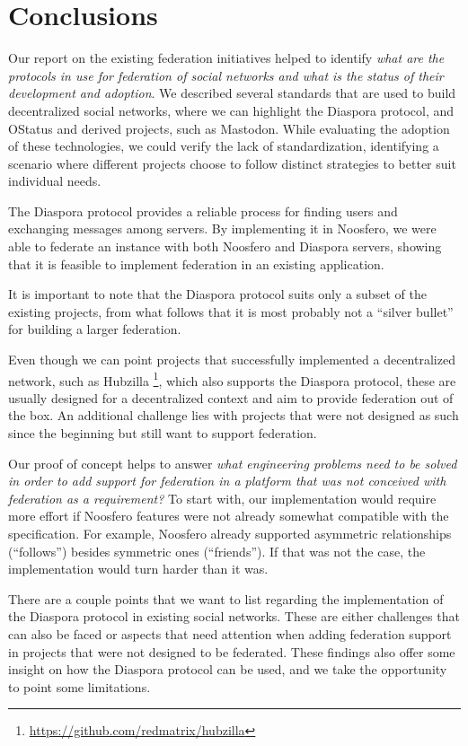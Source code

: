 \chapter{Conclusions}
\label{chapter:7}

Our report on the existing federation initiatives helped to identify
\textit{what are the protocols in use for federation of social networks and
what is the status of their development and adoption}. We described several
standards that are used to build decentralized social networks, where we can
highlight the Diaspora protocol, and OStatus and derived projects, such as
Mastodon. While evaluating the adoption of these technologies, we could verify
the lack of standardization, identifying a scenario where different projects
choose to follow distinct strategies to better suit individual needs.

The Diaspora protocol provides a reliable process for finding users and
exchanging messages among servers. By implementing it in Noosfero, we
were able to federate an instance with both Noosfero and Diaspora
servers, showing that it is feasible to implement federation in an
existing application.

It is important to note that the Diaspora protocol suits only a subset
of the existing projects, from what follows that it is most probably not
a ``silver bullet'' for building a larger federation.

Even though we can point projects that successfully implemented a
decentralized network, such as Hubzilla
\footnote{\url{https://github.com/redmatrix/hubzilla}},
which also supports the Diaspora protocol, these are usually designed
for a decentralized context and aim to provide federation out of the box.
An additional challenge lies with projects that were not designed as
such since the beginning but still want to support federation.

Our proof of concept helps to answer \textit{what engineering problems need to
be solved in order to add support for federation in a platform that was not
conceived with federation as a requirement?} To start with, our implementation
would require more effort if Noosfero features were not already somewhat
compatible with the specification. For example, Noosfero already supported
asymmetric relationships (``follows'') besides symmetric ones (``friends'').
If that was not the case, the implementation would turn harder than it was.

There are a couple points that we want to list regarding the implementation of
the Diaspora protocol in existing social networks. These are either challenges
that can also be faced or aspects that need attention when adding federation
support in projects that were not designed to be federated. These findings also
offer some insight on how the Diaspora protocol can be used, and we take the
opportunity to point some limitations.


